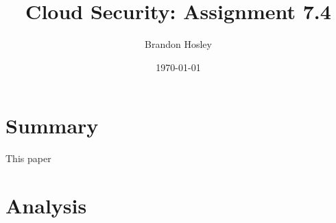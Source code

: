 \documentclass[]{article}
\title{Cloud Security: Assignment 7.4}
\author{Brandon Hosley}
\date{\today}
\begin{document}
	\maketitle
	
\section{Summary} 

This paper\cite{Lakkaraju2015} 


\section{Analysis}




\clearpage


\end{document}
